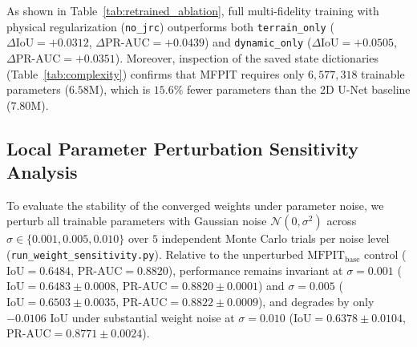 \documentclass[preprint,12pt]{elsarticle}
\begin{document}
\begin{table}[htbp]
\caption{Verified Architectural Parameter Counts and Asymptotic Complexity}
\label{tab:complexity}
\centering
{}
\end{table}

As shown in Table~\ref{tab:retrained_ablation}, full multi-fidelity training with physical regularization (\texttt{no\_jrc}) outperforms both \texttt{terrain\_only} ($\Delta\text{IoU} = +0.0312$, $\Delta\text{PR-AUC} = +0.0439$) and \texttt{dynamic\_only} ($\Delta\text{IoU} = +0.0505$, $\Delta\text{PR-AUC} = +0.0351$). Moreover, inspection of the saved state dictionaries (Table~\ref{tab:complexity}) confirms that MFPIT requires only $6,577,318$ trainable parameters ($6.58\text{M}$), which is $15.6\%$ fewer parameters than the 2D U-Net baseline ($7.80\text{M}$).

\subsection{Local Parameter Perturbation Sensitivity Analysis}
To evaluate the stability of the converged weights under parameter noise, we perturb all trainable parameters with Gaussian noise $\mathcal{N}(0, \sigma^2)$ across $\sigma \in \{0.001, 0.005, 0.010\}$ over $5$ independent Monte Carlo trials per noise level (\texttt{run\_weight\_sensitivity.py}). Relative to the unperturbed $\text{MFPIT}_{\text{base}}$ control ($\text{IoU} = 0.6484$, $\text{PR-AUC} = 0.8820$), performance remains invariant at $\sigma = 0.001$ ($\text{IoU} = 0.6483 \pm 0.0008$, $\text{PR-AUC} = 0.8820 \pm 0.0001$) and $\sigma = 0.005$ ($\text{IoU} = 0.6503 \pm 0.0035$, $\text{PR-AUC} = 0.8822 \pm 0.0009$), and degrades by only $-0.0106$ IoU under substantial weight noise at $\sigma = 0.010$ ($\text{IoU} = 0.6378 \pm 0.0104$, $\text{PR-AUC} = 0.8771 \pm 0.0024$).
\end{document}
